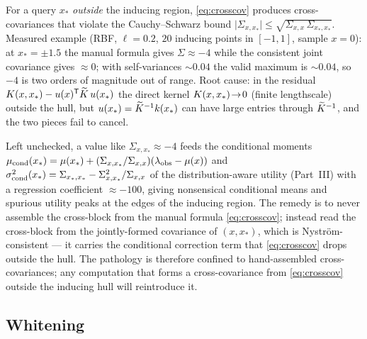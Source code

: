 \begin{remark}
For a query $x_\ast$ \emph{outside} the inducing region, \eqref{eq:crosscov}
produces cross-covariances that violate the Cauchy--Schwarz bound
$\lvert\Sigma_{x,x_\ast}\rvert\le\sqrt{\Sigma_{x,x}\,\Sigma_{x_\ast,x_\ast}}$.
Measured example (RBF, $\ell=0.2$, $20$ inducing points in $[-1,1]$, sample
$x=0$): at $x_\ast=\pm1.5$ the manual formula gives $\Sigma\approx-4$ while
the consistent joint covariance gives $\approx 0$; with self-variances $\sim0.04$
the valid maximum is $\sim0.04$, so $-4$ is two orders of magnitude out of range.
Root cause: in the residual $K(x,x_\ast)-u(x)^{\mathsf{T}}\widetilde{K}\,u(x_\ast)$ the
direct kernel $K(x,x_\ast)\!\to\!0$ (finite lengthscale) outside the hull, but
$u(x_\ast)=\widetilde{K}^{-1}k(x_\ast)$ can have large entries through $\widetilde{K}^{-1}$,
and the two pieces fail to cancel.
\end{remark}

Left unchecked, a value like $\Sigma_{x,x_\ast}\approx-4$ feeds the conditional
moments
$\mu_{\mathrm{cond}}(x_\ast)=\mu(x_\ast)+(\Sigma_{x,x_\ast}/\Sigma_{x,x})(\lambda_{\mathrm{obs}}-\mu(x))$
and $\sigma^{2}_{\mathrm{cond}}(x_\ast)=\Sigma_{x_\ast,x_\ast}-\Sigma_{x,x_\ast}^2/\Sigma_{x,x}$
of the distribution-aware utility (Part~III) with a regression coefficient
$\approx-100$, giving nonsensical conditional means and spurious utility peaks at
the edges of the inducing region. The remedy is to never assemble the cross-block
from the manual formula \eqref{eq:crosscov}; instead read the cross-block from the
jointly-formed covariance of $(x,x_\ast)$, which is Nystr\"om-consistent --- it
carries the conditional correction term that \eqref{eq:crosscov} drops outside the
hull. The pathology is therefore confined to hand-assembled cross-covariances; any
computation that forms a cross-covariance from \eqref{eq:crosscov} outside the
inducing hull will reintroduce it.

\subsection{Whitening}\label{sec:whitening}

